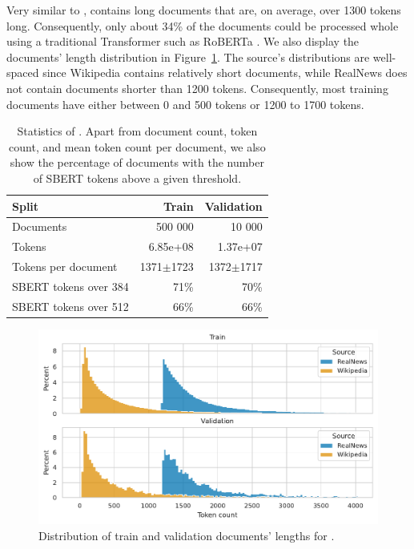 Very similar to ,  contains long documents
that are, on average, over 1300 tokens long. Consequently, only about 34\% of
the documents could be processed whole using a traditional Transformer such as
RoBERTa \citep{liu2019roberta}. We also display the documents' length
distribution in Figure~\ref{fig:val_data_dist}. The source's distributions are well-spaced since Wikipedia contains
relatively short documents, while RealNews does not contain documents shorter
than 1200 tokens. Consequently, most training documents have either between 0 and 500 tokens or 1200 to 1700 tokens.

\begin{table}
  \centering
  \footnotesize

  \begin{tabular}{lrr}
    \toprule
      Split & Train & Validation \\
    \midrule
      Documents & 500 000 & 10 000 \\
      Tokens & 6.85e+08 & 1.37e+07 \\
      Tokens per document & 1371$\pm$1723 & 1372$\pm$1717 \\
      SBERT tokens over 384 & 71\% & 70\% \\
      SBERT tokens over 512 & 66\% & 66\% \\
    \bottomrule
  \end{tabular}

  \caption{Statistics of . Apart from document count, token
  count, and mean token count per document, we also show the percentage of documents
  with the number of SBERT tokens above a given threshold.}

  \label{table:val_data_stats}

\end{table}

\begin{figure}

  \includegraphics[width=\textwidth]{./img/val_data_dist.pdf}

  \caption{Distribution of train and validation documents' lengths for
  .}

  \label{fig:val_data_dist}

\end{figure}

